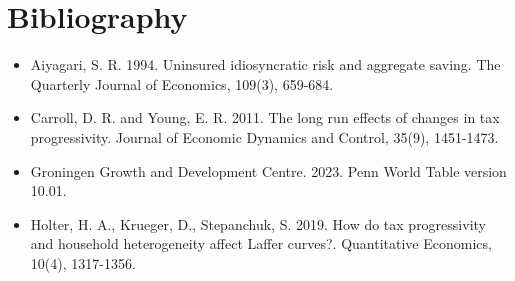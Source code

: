 \documentclass{article}
\begin{document}
\section*{Bibliography}

\begin{itemize}
\item Aiyagari, S. R. 1994. Uninsured idiosyncratic risk and aggregate saving. The Quarterly Journal of Economics, 109(3), 659-684.
\item Carroll, D. R. and Young, E. R. 2011. The long run effects of changes in tax progressivity. Journal of Economic Dynamics and Control, 35(9), 1451-1473.
\item Groningen Growth and Development Centre. 2023. Penn World Table version 10.01.
\item Holter, H. A., Krueger, D., Stepanchuk, S. 2019. How do tax progressivity and household heterogeneity affect Laffer curves?. Quantitative Economics, 10(4), 1317-1356.
\end{itemize}
\end{document}
